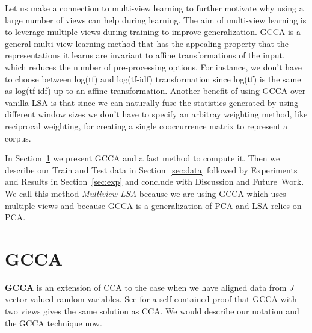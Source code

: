 \documentclass[11pt]{article}
\begin{document}
Let us make a connection to multi-view learning to further motivate
why using a large number of views can help during learning. The aim of
multi-view learning is to leverage multiple views during training to
improve generalization. GCCA is a general multi view learning method that has the appealing
property that the representations it learns are invariant to affine
transformations of the input, which reduces the number of
pre-processing options. For instance, we don't have to choose 
between log(tf) and log(tf-idf) transformation since log(tf) is the
same as log(tf-idf) up to an affine transformation. Another benefit of
using GCCA over vanilla LSA is that since we can naturally 
fuse the statistics generated by using different window sizes we
don't have to specify an arbitray weighting method, like reciprocal
weighting, for creating a single cooccurrence matrix to represent a
corpus.



In Section~\ref{sec:gcca} we present GCCA and a fast method to
compute it. 
Then we describe our Train and Test data in
Section~\ref{sec:data} followed by Experiments and Results in
Section~\ref{sec:exp} and conclude with Discussion and Future~Work. 
We call this method \textit{Multiview LSA} because we are using GCCA
which uses multiple views and because GCCA is a generalization of PCA and LSA
relies on PCA. 
\section{GCCA}
\label{sec:gcca}
\textbf{GCCA} is an extension of CCA to the case when we have aligned data from $J$
vector valued random variables. See \cite{velden2011on} for a self
contained proof that GCCA with two views gives the same solution as
CCA. We would describe our notation and the GCCA technique now.
\end{document}
